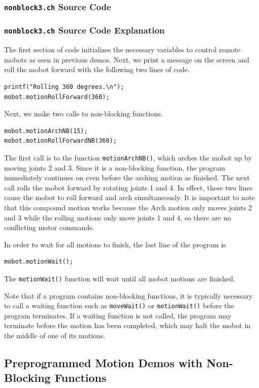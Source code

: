 \documentclass{article}
\begin{document}
\subsubsection{\texttt{nonblock3.ch} Source Code}

\subsubsection{\texttt{nonblock3.ch} Source Code Explanation}
The first section of code initializes the necessary variables to control remote
mobots as seen in previous demos. Next, we print a message on the screen and 
roll the mobot forward with the following two lines of code.
\begin{verbatim}
printf("Rolling 360 degrees.\n");
mobot.motionRollForward(360);
\end{verbatim}
Next, we make two calls to non-blocking functions.
\begin{verbatim}
mobot.motionArchNB(15);
mobot.motionRollForwardNB(360);
\end{verbatim}
The first call is to the function \texttt{motionArchNB()}, which arches the mobot
up by moving joints 2 and 3. Since it is a non-blocking function, the program
immediately continues on even before the arching motion as finished. The
next call rolls the mobot forward by rotating joints 1 and 4. In effect, these
two lines cause the mobot to roll forward and arch simultaneously. It is important
to note that this compound motion works because the Arch motion only moves 
joints 2 and 3 while the rolling motions only move joints 1 and 4, so there are
no conflicting motor commands.

In order to wait for all motions to finish, the last line of the program is
\begin{verbatim}
mobot.motionWait();
\end{verbatim}
The \texttt{motionWait()} function will wait until all mobot motions are finished.

Note that
if a program contains non-blocking functions, it is typically necessary to 
call a waiting function such as \texttt{moveWait()} or \texttt{motionWait()}
before the program terminates. If a waiting function is not called, the program
may terminate before the motion has been completed, which may halt the mobot
in the middle of one of its motions.

\subsection{Preprogrammed Motion Demos with Non-Blocking Functions}
\end{document}

